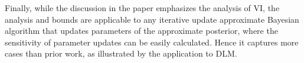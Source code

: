 Finally,
while the discussion in the paper emphasizes the analysis of VI, 
the analysis and bounds are applicable to any iterative update 
approximate Bayesian 
algorithm that updates parameters of the approximate posterior, where the sensitivity of parameter updates can be easily calculated.
Hence it captures more cases than prior work, as illustrated by the application to DLM.